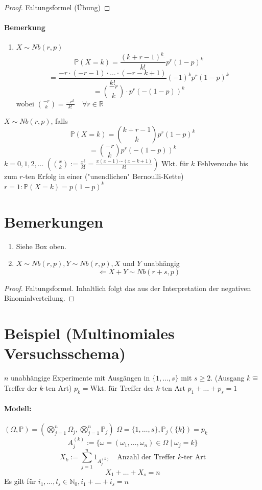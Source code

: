 \documentclass[a4paper,11pt,notitlepage]{report}
\newcommand{\R}{{\ensuremath{\mathbb{R}}}}
\newcommand{\N}{{\ensuremath{\mathbb{N}}}}
\newcommand{\Prim}{{\ensuremath{\mathbb{P}}}}
\begin{document}
\begin{proof}
	Faltungsformel (Übung)
\end{proof}

\paragraph{Bemerkung}
\begin{enumerate}
	\item $X \sim Nb(r,p)$
		$$\Prim(X=k) = \frac{(k+r-1)^{k_\_}}{k!} p^r (1-p)^k$$
		$$= \frac{-r \cdot (-r-1) \cdot \ldots \cdot (-r-k+1)}{k!} (-1)^k p^r (1-p)^k$$
		$$= {-r \choose k} \cdot p^r (-(1-p))^k$$
		wobei ${-r \choose k} = \frac{-r^k}{k!} \quad \forall r \in \R$
\end{enumerate}

$X \sim Nb(r,p)$, falls
$$\Prim(X=k)= {k+r-1 \choose k} p^r (1-p)^k$$
$$= \boxed{{-r \choose k} p^r (-(1-p))^k}$$
$k = 0,1,2,\ldots$
$({x \choose k} := \frac{x^{\underline{k}}}{k!} = \frac{x(x-1)\cdots (x-k+1)}{k!})$
Wkt. für $k$ Fehlversuche bis zum $r$-ten Erfolg in einer ("unendlichen" Bernoulli-Kette) $r = 1: \Prim(X=k) = p (1-p)^k$

\section{Bemerkungen}
\begin{enumerate}
	\item Siehe Box oben.
	\item $X \sim Nb(r,p), Y \sim Nb(r,p), X$ und $Y$ unabhängig $$\Leftarrow X+Y \sim Nb(r+s,p)$$
\end{enumerate}

\begin{proof}
	Faltungsformel.
	Inhaltlich folgt das aus der Interpretation der negativen Binomialverteilung.
\end{proof}

\section{Beispiel (Multinomiales Versuchsschema)}

$n$ unabhängige Experimente mit Ausgängen in $\{1,\ldots,s\}$ mit $s \geq 2$. (Ausgang $k \hat{=}$ Treffer der $k$-ten Art) \newline
$p_k = \text{Wkt. für Treffer der $k$-ten Art}$ \newline
$p_1 + \ldots + p_s = 1$
\paragraph{Modell:} $(\Omega, \Prim) = (\bigotimes\limits_{j=1}^n{\Omega_j}, \bigotimes\limits_{j=1}^n{\Prim_j})$
\newline
$\Omega = \{1,\ldots,s\}, \Prim_j(\{k\}) = p_k$
\newline
$$A_j^{(k)}:= \{\omega = (\omega_1, \ldots, \omega_n) \in \Omega \mid \omega_j = k \}$$
$$X_k:= \sum\limits_{j=1}^n{1_{A_j^{(k)}}} \quad \text{Anzahl der Treffer $k$-ter Art}$$
$$X_1 + \ldots + X_s = n$$
Es gilt für $i_1, \ldots, l_s \in \N_0, i_1 + \ldots + i_s = n$
\end{document}
